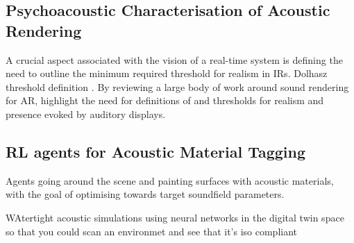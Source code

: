 \subsection{Psychoacoustic Characterisation of Acoustic Rendering}
A crucial aspect associated with the vision of a real-time system is defining the need to outline the minimum required threshold for realism in IRs.
Dolhasz threshold definition \citep{Dolhasz_2020_CVPR}. 
By reviewing a large body of work around sound rendering for AR, \cite{yang2019audio} highlight the need for definitions of  and thresholds for realism and presence evoked by auditory displays. 

\subsection{RL agents for Acoustic Material Tagging}
Agents going around the scene and painting surfaces with acoustic materials, with the goal of optimising towards target soundfield parameters.

WAtertight acoustic simulations using neural networks in the digital twin space so that you could scan an environmet and see that it's iso compliant



